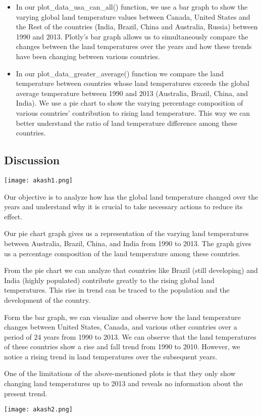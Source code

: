 \documentclass[a4paper, 11pt]{report}
\begin{document}
\begin{itemize}
    \item In our plot\_data\_usa\_can\_all() function, we use a bar graph to show the varying global land temperature values between Canada, United States and the Rest of the countries (India, Brazil, China and Australia, Russia) between 1990 and 2013. Plotly’s bar graph allows us to simultaneously compare the changes between the land temperatures over the years and how these trends have been changing between various countries.

    \item In our plot\_data\_greater\_average() function we compare the land temperature between countries whose land temperatures exceeds the global average temperature between 1990 and 2013 (Australia, Brazil, China, and India). We use a pie chart to show the varying percentage composition of various countries’ contribution to rising land temperature. This way we can better understand the ratio of land temperature difference among these countries.

\end{itemize}

\subsection{Discussion}

\begin{multicols}{2}
\texttt{[image: akash1.png]}

Our objective is to analyze how has the global land temperature changed over the years and understand why it is crucial to take necessary actions to reduce its effect.

Our pie chart graph gives us a representation of the varying land temperatures between  Australia, Brazil, China, and India from 1990 to 2013. The graph gives us a percentage composition of the land temperature among these countries.


\end{multicols}

From the pie chart we can analyze that countries like Brazil (still developing) and India (highly populated) contribute greatly to the rising global land temperatures. This rise in trend can be traced to the population and the development of the country.

	\begin{multicols}{2}
	Form the bar graph, we can visualize and observe how the land temperature changes between United States, Canada, and various other countries over a period of 24 years from 1990 to 2013. We can observe that the land temperatures of these countries show a rise and fall trend from 1990 to 2010. However, we notice a rising trend in land temperatures over the subsequent years.

	One of the limitations of the above-mentioned plots is that they only show changing land temperatures up to 2013 and reveals no information about the present trend.

	\texttt{[image: akash2.png]}
	\end{multicols}
\end{document}

